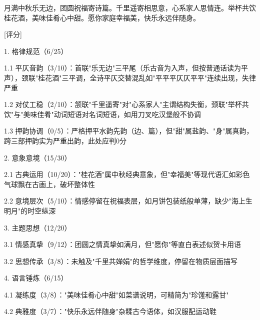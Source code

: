 \begin{tcolorbox}[
    breakable,            %
    colback=white, %
    colframe=black, 
    boxrule=1pt,        %
    arc=0mm             %
    ]
    \kaishu 
    月满中秋乐无边，团圆祝福寄诗篇。千里遥寄相思意，心系家人思情连。举杯共饮桂花酒，美味佳肴心中甜。愿你家庭幸福美，快乐永远伴随身。

    \vspace{0.1em}
    \noindent\dotfill

    [评分]\par
    1. 格律规范（6/25）\par
    \hspace{2em}1.1 平仄音韵（3/10）：首联"乐无边"三平尾（乐古音为入声，但按普通话读为平声），颈联"桂花酒"三平调，全诗平仄交替混乱如"平平平仄仄平平"连续出现，失律严重\par
    \hspace{2em}1.2 对仗工稳（2/10）：颔联"千里遥寄"对"心系家人"主谓结构失衡，颈联"举杯共饮"与"美味佳肴"动词短语对名词短语，如用刀叉吃汉堡般不协调\par
    \hspace{2em}1.3 押韵协调（0/5）：严格押平水韵先韵（边、篇），但"甜"属盐韵、"身"属真韵，跨三部押韵实为严重出韵，此处应判0分\par

    2. 意象意境（15/30）\par
    \hspace{2em}2.1 古典运用（10/20）："桂花酒"属中秋经典意象，但"幸福美"等现代语汇如彩色气球飘在古画上，破坏整体性\par
    \hspace{2em}2.2 意境层次（5/10）：情感停留在祝福表层，如月饼包装纸般单薄，缺少"海上生明月"的时空纵深\par

    3. 主题思想（12/20）\par
    \hspace{2em}3.1 情感真挚（9/12）：团圆之情真挚如满月，但"愿你"等直白表述似贺卡用语\par
    \hspace{2em}3.2 思想传承（3/8）：未触及"千里共婵娟"的哲学维度，停留在物质层面描写\par

    4. 语言锤炼（6/15）\par
    \hspace{2em}4.1 凝练度（3/8）："美味佳肴心中甜"如菜谱说明，可精简为"珍馐和露甘"\par
    \hspace{2em}4.2 典雅度（3/7）："快乐永远伴随身"杂糅古今语体，如汉服配运动鞋\par


\end{tcolorbox}
